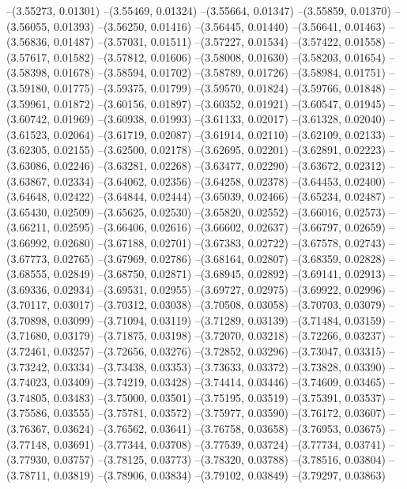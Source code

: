 --(3.55273, 0.01301)
--(3.55469, 0.01324)
--(3.55664, 0.01347)
--(3.55859, 0.01370)
--(3.56055, 0.01393)
--(3.56250, 0.01416)
--(3.56445, 0.01440)
--(3.56641, 0.01463)
--(3.56836, 0.01487)
--(3.57031, 0.01511)
--(3.57227, 0.01534)
--(3.57422, 0.01558)
--(3.57617, 0.01582)
--(3.57812, 0.01606)
--(3.58008, 0.01630)
--(3.58203, 0.01654)
--(3.58398, 0.01678)
--(3.58594, 0.01702)
--(3.58789, 0.01726)
--(3.58984, 0.01751)
--(3.59180, 0.01775)
--(3.59375, 0.01799)
--(3.59570, 0.01824)
--(3.59766, 0.01848)
--(3.59961, 0.01872)
--(3.60156, 0.01897)
--(3.60352, 0.01921)
--(3.60547, 0.01945)
--(3.60742, 0.01969)
--(3.60938, 0.01993)
--(3.61133, 0.02017)
--(3.61328, 0.02040)
--(3.61523, 0.02064)
--(3.61719, 0.02087)
--(3.61914, 0.02110)
--(3.62109, 0.02133)
--(3.62305, 0.02155)
--(3.62500, 0.02178)
--(3.62695, 0.02201)
--(3.62891, 0.02223)
--(3.63086, 0.02246)
--(3.63281, 0.02268)
--(3.63477, 0.02290)
--(3.63672, 0.02312)
--(3.63867, 0.02334)
--(3.64062, 0.02356)
--(3.64258, 0.02378)
--(3.64453, 0.02400)
--(3.64648, 0.02422)
--(3.64844, 0.02444)
--(3.65039, 0.02466)
--(3.65234, 0.02487)
--(3.65430, 0.02509)
--(3.65625, 0.02530)
--(3.65820, 0.02552)
--(3.66016, 0.02573)
--(3.66211, 0.02595)
--(3.66406, 0.02616)
--(3.66602, 0.02637)
--(3.66797, 0.02659)
--(3.66992, 0.02680)
--(3.67188, 0.02701)
--(3.67383, 0.02722)
--(3.67578, 0.02743)
--(3.67773, 0.02765)
--(3.67969, 0.02786)
--(3.68164, 0.02807)
--(3.68359, 0.02828)
--(3.68555, 0.02849)
--(3.68750, 0.02871)
--(3.68945, 0.02892)
--(3.69141, 0.02913)
--(3.69336, 0.02934)
--(3.69531, 0.02955)
--(3.69727, 0.02975)
--(3.69922, 0.02996)
--(3.70117, 0.03017)
--(3.70312, 0.03038)
--(3.70508, 0.03058)
--(3.70703, 0.03079)
--(3.70898, 0.03099)
--(3.71094, 0.03119)
--(3.71289, 0.03139)
--(3.71484, 0.03159)
--(3.71680, 0.03179)
--(3.71875, 0.03198)
--(3.72070, 0.03218)
--(3.72266, 0.03237)
--(3.72461, 0.03257)
--(3.72656, 0.03276)
--(3.72852, 0.03296)
--(3.73047, 0.03315)
--(3.73242, 0.03334)
--(3.73438, 0.03353)
--(3.73633, 0.03372)
--(3.73828, 0.03390)
--(3.74023, 0.03409)
--(3.74219, 0.03428)
--(3.74414, 0.03446)
--(3.74609, 0.03465)
--(3.74805, 0.03483)
--(3.75000, 0.03501)
--(3.75195, 0.03519)
--(3.75391, 0.03537)
--(3.75586, 0.03555)
--(3.75781, 0.03572)
--(3.75977, 0.03590)
--(3.76172, 0.03607)
--(3.76367, 0.03624)
--(3.76562, 0.03641)
--(3.76758, 0.03658)
--(3.76953, 0.03675)
--(3.77148, 0.03691)
--(3.77344, 0.03708)
--(3.77539, 0.03724)
--(3.77734, 0.03741)
--(3.77930, 0.03757)
--(3.78125, 0.03773)
--(3.78320, 0.03788)
--(3.78516, 0.03804)
--(3.78711, 0.03819)
--(3.78906, 0.03834)
--(3.79102, 0.03849)
--(3.79297, 0.03863)
